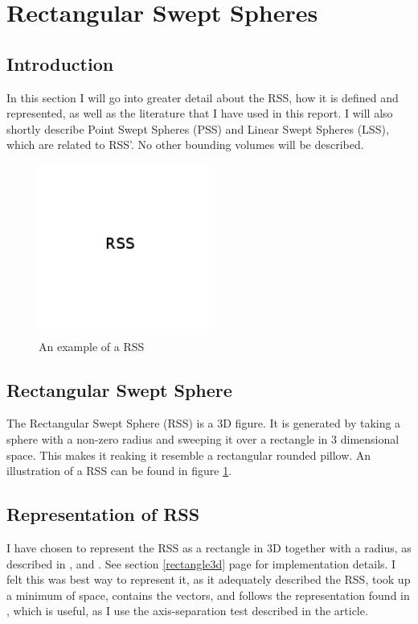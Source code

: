 
\section{Rectangular Swept Spheres}
\label{rss}

\subsection{Introduction}
In this section I will go into greater detail about the RSS, how it is defined and represented, as well as the literature that I have used in this report. I will also shortly describe Point Swept Spheres (PSS) and Linear Swept Spheres (LSS), which are related to RSS'. No other bounding volumes will be described. 

\begin{figure}
\centering
\includegraphics[width=0.5\textwidth]{figures/rss}
\caption{\label{rss-example}An example of a RSS}
\end{figure}

\subsection{Rectangular Swept Sphere}
The Rectangular Swept Sphere (RSS) is a 3D figure. It is generated by taking a sphere with a non-zero radius and sweeping it over a rectangle in 3 dimensional space. This makes it reaking it resemble a rectangular rounded pillow. An illustration of a RSS can be found in figure \ref{rss-example}. 

\subsection{Representation of RSS}
I have chosen to represent the RSS as a rectangle in 3D together with a radius, as described in \cite{larsen00fast}, \cite{Larsen99fastproximity} and \cite{237244}. See section \ref{rectangle3d} page \pageref{rectangle3d} for  implementation details. I felt this was best way to represent it, as it adequately described the RSS, took up a minimum of space, contains the vectors, and follows the representation found in \cite{237244}, which is useful, as I use the axis-separation test described in the article.

